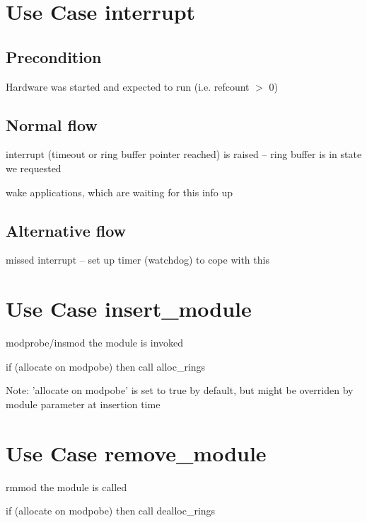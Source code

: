   \section{Use Case interrupt}

  \subsection{Precondition}
  Hardware was started and expected to run (i.e. refcount $>$ 0)

  \subsection{Normal flow}
  \begin{CompactEnumerate}
    \item interrupt (timeout or ring buffer pointer reached) is raised -- ring
  buffer is in state we requested
    \item wake applications, which are waiting for this info up
  \end{CompactEnumerate}

  \subsection{Alternative flow}
  \begin{CompactItemize}
    \item missed interrupt -- set up timer (watchdog) to cope with this
  \end{CompactItemize}

  \section{Use Case insert\_module}
  \begin{CompactEnumerate}
    \item modprobe/insmod the module is invoked
    \item if (allocate on modpobe) then call alloc\_rings
  \end{CompactEnumerate}

  Note: 'allocate on modpobe' is set to true by default, but might be
  overriden by module parameter at insertion time

  \section{Use Case remove\_module}

  \begin{CompactEnumerate}
    \item rmmod the module is called
    \item if (allocate on modpobe) then call dealloc\_rings
  \end{CompactEnumerate}


